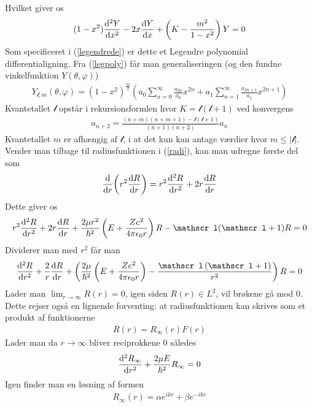 \documentclass[12pt]{article}
\theoremstyle{definition}
\theoremstyle{remark}
\theoremstyle{definition}
\numberwithin{equation}{section}
\begin{document}
Hvilket giver os
\begin{align}
    (1-x^2)\frac{{\rm d}^2Y}{{\rm d}x^2}-2x\frac{{\rm d}Y}{{\rm d}x}+\left(K-\frac{m^2}{1-x^2}\right)Y=0
\end{align}
Som specificeret i (\ref{legendrede}) er dette et Legendre polynomial differentialigning. Fra (\ref{legpoly}) får man generaliseringen (og den fundne vinkelfunktion $Y(\theta, \varphi)$)
\begin{align}
    Y_{\mathscr l,m}(\theta, \varphi)=(1-x^2)^{\frac{m}{2}}\left(a_0\sum_{n=0}^{\infty}\frac{a_{2n}}{a_0}x^{2n}+a_1\sum_{n=1}^{\infty}\frac{a_{2n+1}}{a_1}x^{2n+1}\right)
\end{align}
Kvantetallet $\mathscr l$ opstår i rekursionsformlen hvor $K=\mathscr l ( \mathscr l +1)$ ved konvergens
\begin{align}
    a_{n+2}=\frac{(n+m)(n+m+1)-\mathscr l(\mathscr l+1)}{(n+1)(n+2)}a_n
\end{align}
Kvantetallet $m$ er afhængig af $\mathscr l$, i at det kun kan antage værdier hvor $m\leq|\mathscr l|$. Vender man tilbage til radiusfunktionen i (\ref{radi}), kan man udregne første del som
\begin{align}
    \dv{r}\qty ( r^2 \dv{R}{r}) = r^2 \dv[2]{R}{r} + 2r\dv{R}{r}
\end{align}
Dette giver os
\begin{align}
    r^2\frac{{\rm d}^2R}{{\rm d}r^2}+2r\frac{{\rm d}R}{{\rm d}r}+\frac{2\mu r^2}{\hbar^2}\left(E+\frac{Ze^2}{4\pi\epsilon_0r}\right)R-\mathscr l(\mathscr l+1)R=0
\end{align}
Dividerer man med $r^2$ får man
\begin{align}
\label{whatbesubs}
    \frac{{\rm d}^2R}{{\rm d}r^2}
    +\frac{2}{r}\frac{{\rm d}R}{{\rm d}r}
    +\left(\frac{2\mu}{\hbar^2}\left(E+\frac{Ze^2}{4\pi\epsilon_0r}\right)
    -\frac{\mathscr l\left(\mathscr l+1\right)}{r^2}\right)R=0
\end{align}
Lader man $\lim_{r\to \infty} R(r)=0$, igen siden $R(r)\in L^2$, vil brøkene gå mod 0. Dette rejser også en lignende forventing: at radiusfunktionen kan skrives som et produkt af funktionerne
\begin{align}
    R(r) = R_{\infty}(r)F(r)
\end{align}
Lader man da $r\to \infty$ bliver reciprokkene 0 således
\begin{align}
    \frac{{\rm d}^2R_{\infty}}{{\rm d}r^2}+\frac{2\mu E}{\hbar^2}R_{\infty}=0
\end{align}
Igen finder man en løsning af formen
\begin{align}
    R_{\infty}(r)=\alpha e^{ikr}+\beta e^{-ikr}
\end{align}
\end{document}
